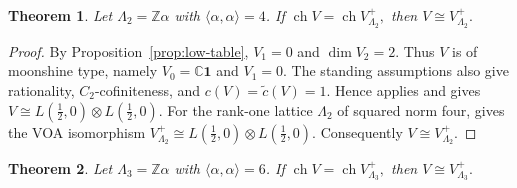 \documentclass[10pt,a4paper]{amsart}
\numberwithin{equation}{section} \newtheorem{thm}{Theorem}[section] \newtheorem{lem}[thm]{Lemma} \newtheorem{ex}[thm]{Example} \newtheorem{prop}[thm]{Proposition} \newtheorem{cor}[thm]{Corollary} \newtheorem{defi}[thm]{Definition} \newtheorem{rmk}[thm]{Remark} \newtheorem{notation}[thm]{Notation}
\newcommand{\one}{\mathbf{1}}
\newcommand{\ch}{\operatorname{ch}}
\def\Z{\mathbb{Z}} \def\N{\mathbb{N}} \def\A{\mathbb{A}} \def\C{\mathbb{C}} \def\R{\mathbb{R}} \def\Q{\mathbb{Q}} \def\F{\mathbb{F}}
\begin{document}
\begin{thm}\label{thm:k2}
Let $\Lambda_2=\Z\alpha$ with $\langle\alpha,\alpha\rangle=4$. If \(\ch V=\ch V_{\Lambda_2}^+,\) then \(V\cong V_{\Lambda_2}^+.\)
\end{thm}

\begin{proof}
By Proposition~\ref{prop:low-table}, \(V_1=0\) and $\dim V_2=2$. Thus $V$ is of moonshine type, namely $V_0=\C\one$ and $V_1=0$. The standing assumptions also give rationality, $C_2$-cofiniteness, and $c(V)=\widetilde c(V)=1$. Hence \cite[Theorem~4.7]{ZhangDong} applies and gives \(V\cong L\!\left(\frac12,0\right)\otimes L\!\left(\frac12,0\right).\) For the rank-one lattice $\Lambda_2$ of squared norm four, \cite[Remark~3.2]{DG98} gives the VOA isomorphism \(V_{\Lambda_2}^+\cong L\!\left(\frac12,0\right)\otimes L\!\left(\frac12,0\right).\) Consequently $V\cong V_{\Lambda_2}^+$.
\end{proof}

\begin{thm}\label{thm:k3}
Let $\Lambda_3=\Z\alpha$ with $\langle\alpha,\alpha\rangle=6$. If \(\ch V=\ch V_{\Lambda_3}^+,\) then \(V\cong V_{\Lambda_3}^+.\)
\end{thm}
\end{document}
